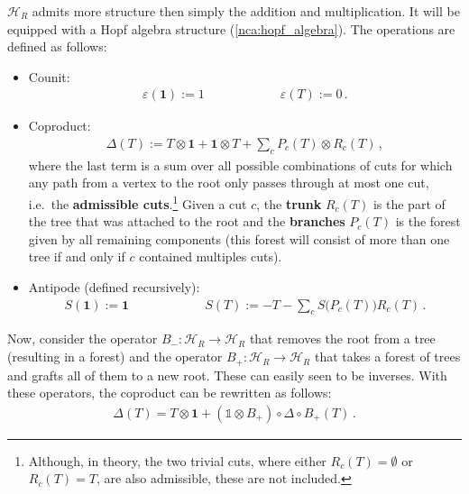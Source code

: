     $\mathcal{H}_R$ admits more structure then simply the addition and multiplication. It will be equipped with a Hopf algebra structure (\cref{nca:hopf_algebra}). The operations are defined as follows:
    \begin{itemize}
        \item Counit:
        \begin{gather}
            \label{qft:connes_kreimer_counit}
            \varepsilon(\mathbf{1}):=1 \qquad\qquad\qquad \varepsilon(T):=0\,.
        \end{gather}
        \item Coproduct:
        \begin{gather}
            \Delta(T) := T\otimes\mathbf{1}+\mathbf{1}\otimes T+\sum_cP_c(T)\otimes R_c(T)\,,
        \end{gather}
        where the last term is a sum over all possible combinations of cuts for which any path from a vertex to the root only passes through at most one cut, i.e.~the \textbf{admissible cuts}.\footnote{Although, in theory, the two trivial cuts, where either $R_c(T)=\emptyset$ or $R_c(T)=T$, are also admissible, these are not included.} Given a cut $c$, the \textbf{trunk} $R_c(T)$ is the part of the tree that was attached to the root and the \textbf{branches} $P_c(T)$ is the forest given by all remaining components (this forest will consist of more than one tree if and only if $c$ contained multiples cuts).
        \item Antipode (defined recursively):
        \begin{gather}
            \label{qft:antipode}
            S(\mathbf{1}) := \mathbf{1} \qquad\qquad\qquad S(T) := -T-\sum_cS\bigl(P_c(T)\bigr)R_c(T)\,.
        \end{gather}
    \end{itemize}
    Now, consider the operator $B_-:\mathcal{H}_R\rightarrow\mathcal{H}_R$ that removes the root from a tree (resulting in a forest) and the operator $B_+:\mathcal{H}_R\rightarrow\mathcal{H}_R$ that takes a forest of trees and grafts all of them to a new root. These can easily seen to be inverses. With these operators, the coproduct can be rewritten as follows:
    \begin{gather}
        \Delta(T) = T\otimes\mathbf{1} + (\mathbb{1}\otimes B_+)\circ\Delta\circ B_+(T)\,.
    \end{gather}

